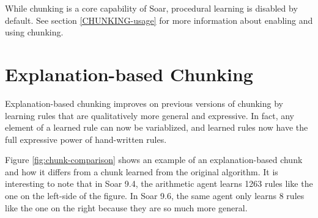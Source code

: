 While chunking is a core capability of Soar, procedural learning is disabled by default.  See section \ref{CHUNKING-usage} for more information about enabling and using chunking.

\section{Explanation-based Chunking}

Explanation-based chunking improves on previous versions of chunking by learning rules that are qualitatively more general and expressive.  In fact, any element of a learned rule can now be variablized, and learned rules now have the full expressive power of hand-written rules. 

Figure \ref{fig:chunk-comparison} shows an example of an explanation-based chunk and how it differs from a chunk learned from the original algorithm.  It is interesting to note that in Soar 9.4, the arithmetic agent learns 1263 rules like the one on the left-side of the figure.  In Soar 9.6, the same agent only learns 8 rules like the one on the right because they are so much more general.

